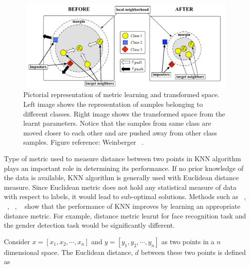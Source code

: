 %
%
% 

\begin{figure}
    \centering
    \includegraphics[width=5in, height=1.8in]{concepts/figures/metric_learning_example.png}
    \caption{Pictorial representation of metric learning and transformed space. Left image shows the
    representation of samples belonging to different classes. Right image shows the transformed space 
    from the learnt parameters. Notice that the samples from same class are moved closer to each other 
    and are pushed away from other class samples. Figure reference: Weinberger \etal ~\cite{weinberger07metric}.}
    \label{fig:metric_learning_example}
\end{figure}

Type of metric used to measure distance between two points in KNN algorithm plays an important role 
in determining its performance. If no prior knowledge of the data is available, KNN algorithm
is generally used with Euclidean distance measure. Since Euclidean metric does not hold any
statistical measure of data with respect to labels, it would lead to sub-optimal solutions. Methods such as
~\cite{Chopra:2005:LSM:1068507.1068961}, ~\cite{NIPS2004_2566}, ~\cite{Shalev-Shwartz:2004:OBL:1015330.1015376}, 
~\cite{Shental:2002:ALR:645318.649268} show that the performance of KNN improves by 
learning an appropriate distance metric. For example, distance metric learnt for face recognition
task and the gender detection task would be significantly different.

Consider $x = [x_1, x_2, \cdots , x_n]$ and $y = [y_1, y_2, \cdots , y_n]$ as two points in a $n$ dimensional space. The Euclidean distance, $d$ between these two points is
defined as


